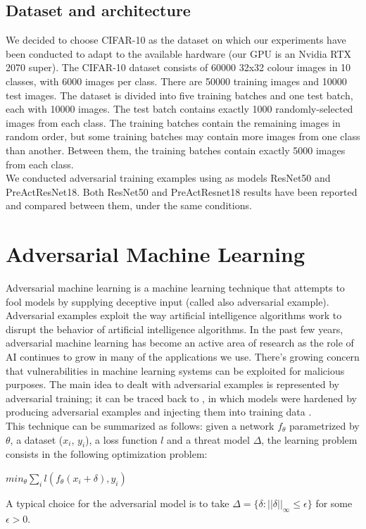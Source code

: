 \documentclass{article}
\begin{document}
\subsection{Dataset and architecture}

We decided to choose CIFAR-10 as the dataset on which our experiments have been conducted to adapt to the available hardware (our GPU is an Nvidia RTX 2070 super). The CIFAR-10 dataset consists of 60000 32x32 colour images in 10 classes, with 6000 images per class. There are 50000 training images and 10000 test images. The dataset is divided into five training batches and one test batch, each with 10000 images. The test batch contains exactly 1000 randomly-selected images from each class. The training batches contain the remaining images in random order, but some training batches may contain more images from one class than another. Between them, the training batches contain exactly 5000 images from each class.\\
We conducted adversarial training examples using as models ResNet50 and PreActResNet18. 
Both ResNet50 and PreActResnet18 results have been reported and compared between them, under the same conditions. 


\section{Adversarial Machine Learning}
Adversarial machine learning is a machine learning technique that attempts to fool models by supplying deceptive input (called also adversarial example). Adversarial examples exploit the way artificial intelligence algorithms work to disrupt the behavior of artificial intelligence algorithms. In the past few years, adversarial machine learning has become an active area of research as the role of AI continues to grow in many of the applications we use. There’s growing concern that vulnerabilities in machine learning systems can be exploited for malicious purposes. The main idea to dealt with adversarial examples is represented by adversarial training; it can be traced back to \cite{GoodfellowEtAl2015}, in which models were hardened by producing adversarial examples and injecting them into training data \cite{ShafahiEtAl2019b}.\\
This technique can be summarized as follows: given a network $f_{\theta}$ parametrized by $\theta$, a dataset ($x_i$, $y_i$), a loss function $l$ and a threat model $\Delta$, the learning problem consists in the following optimization problem:
\begin{center}
	$min_{\theta}{\sum_{i}l(f_{\theta}(x_i + \delta), y_i)}$
\end{center}
A typical choice for the adversarial model is to take $\Delta = \{\delta : ||\delta||_{\infty} \le \epsilon\}$ for some $\epsilon > 0$.
\end{document}
